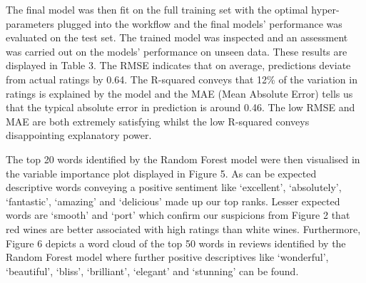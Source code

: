 \documentclass[11pt,preprint]{elsarticle}
\numberwithin{equation}{section}
\numberwithin{figure}{section}
\numberwithin{table}{section}
\begin{document}
The final model was then fit on the full training set with the optimal
hyper-parameters plugged into the workflow and the final models'
performance was evaluated on the test set. The trained model was
inspected and an assessment was carried out on the models' performance
on unseen data. These results are displayed in Table 3. The RMSE
indicates that on average, predictions deviate from actual ratings by
0.64. The R-squared conveys that 12\% of the variation in ratings is
explained by the model and the MAE (Mean Absolute Error) tells us that
the typical absolute error in prediction is around 0.46. The low RMSE
and MAE are both extremely satisfying whilst the low R-squared conveys
disappointing explanatory power.

The top 20 words identified by the Random Forest model were then
visualised in the variable importance plot displayed in Figure 5. As can
be expected descriptive words conveying a positive sentiment like
`excellent', `absolutely', `fantastic', `amazing' and `delicious' made
up our top ranks. Lesser expected words are `smooth' and `port' which
confirm our suspicions from Figure 2 that red wines are better
associated with high ratings than white wines. Furthermore, Figure 6
depicts a word cloud of the top 50 words in reviews identified by the
Random Forest model where further positive descriptives like
`wonderful', `beautiful', `bliss', `brilliant', `elegant' and `stunning'
can be found.
\end{document}
